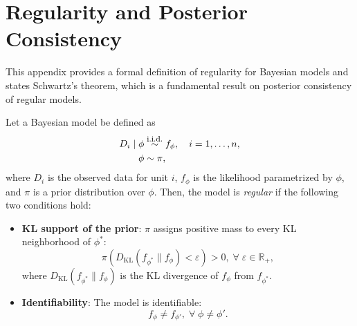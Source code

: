 \documentclass[referee,usenatbib]{biom}
\newcommand{\R}{\mathbb{R}}
\newcommand{\iid}{\overset{\text{\footnotesize i.i.d.}}{\sim}}
\begin{document}
\section{Regularity and Posterior Consistency}
\label{app:posterior_consistency}

This appendix provides a formal definition of regularity for Bayesian models and states Schwartz's theorem, which is a fundamental result on posterior consistency of regular models.

\begin{definition}
\label{def:regularity}
  Let a Bayesian model be defined as
  \begin{align*}
      D_{i} \mid \phi & \iid f_{\phi}, \quad i = 1, \ldots, n, \\
      \phi & \sim \pi,
  \end{align*}
  where \(D_{i}\) is the observed data for unit \(i\), \(f_{\phi}\) is the likelihood parametrized by \(\phi\), and \(\pi\) is a prior distribution over \(\phi\). Then, the model is \textit{regular} if the following two conditions hold:
  \begin{itemize}[leftmargin=*]
    \item \textbf{KL support of the prior}: \(\pi\) assigns positive mass to every KL neighborhood of \(\phi^{*}\):
    \begin{equation*}
      \pi \left( D_{\mathrm{KL}}(f_{\phi^{*}} \| f_{\phi}) < \varepsilon \right) > 0, \; \forall \; \varepsilon \in \R_{+},
    \end{equation*}
    where \(D_{\mathrm{KL}}(f_{\phi^{*}} \| f_{\phi})\) is the KL divergence of \(f_{\phi}\) from \(f_{\phi^{*}}\).
    \item \textbf{Identifiability}: The model is identifiable: 
    \begin{equation*}
        f_{\phi} \neq f_{\phi'}, \; \forall \; \phi \neq \phi'.
    \end{equation*}
  \end{itemize}
\end{definition}
\end{document}

